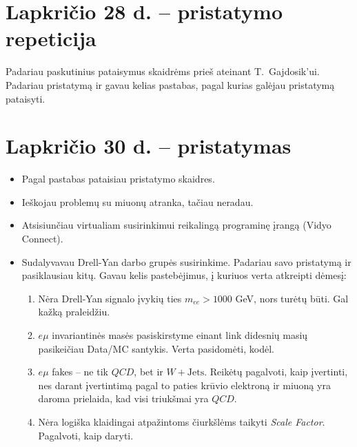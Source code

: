 \documentclass[a4paper, 12pt]{article}
\newcommand{\WJets}{W\! +\!\mathrm{Jets}}
\newcommand{\emu}{e\mu}
\begin{document}
\section{Lapkričio 28 d. -- pristatymo repeticija}

Padariau paskutinius pataisymus skaidrėms prieš ateinant T.\ Gajdosik'ui.
Padariau pristatymą ir gavau kelias pastabas, pagal kurias galėjau pristatymą pataisyti.

\section{Lapkričio 30 d. -- pristatymas}
\begin{itemize}
	\item Pagal pastabas pataisiau pristatymo skaidres.
	\item Ieškojau problemų su miuonų atranka, tačiau neradau.
	\item Atsisiunčiau virtualiam susirinkimui reikalingą programinę įrangą (Vidyo Connect).
	\item Sudalyvavau Drell-Yan darbo grupės susirinkime.
	Padariau savo pristatymą ir pasiklausiau kitų.
	Gavau kelis pastebėjimus, į kuriuos verta atkreipti dėmesį:
	\begin{enumerate}
		\item Nėra Drell-Yan signalo įvykių ties $m_{ee} > 1000$ GeV, nors turėtų būti.
		Gal kažką praleidžiu.
		\item $\emu$ invariantinės masės pasiskirstyme einant link didesnių masių pasikeičiau Data/MC santykis.
		Verta pasidomėti, kodėl.
		\item $\emu$ fakes -- ne tik $QCD$, bet ir $\WJets$.
		Reikėtų pagalvoti, kaip įvertinti, nes darant įvertintimą pagal to paties krūvio elektroną ir miuoną yra
		daroma prielaida, kad visi triukšmai yra $QCD$.
		\item Nėra logiška klaidingai atpažintoms čiurkšlėms taikyti \textit{Scale Factor}.
		Pagalvoti, kaip daryti.
	\end{enumerate}
\end{itemize}
\end{document}
